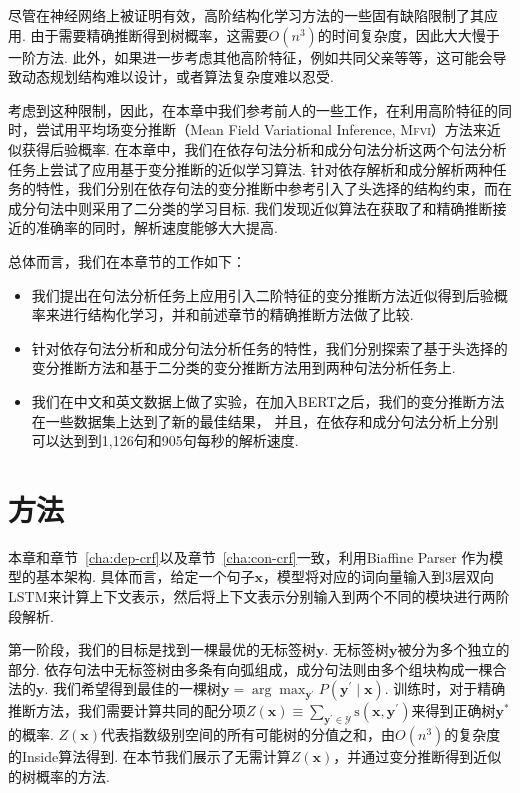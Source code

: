 尽管在神经网络上被证明有效，高阶结构化学习方法的一些固有缺陷限制了其应用.
由于需要精确推断得到树概率，这需要$O(n^3)$的时间复杂度，因此大大慢于一阶方法.
此外，如果进一步考虑其他高阶特征，例如共同父亲等等，这可能会导致动态规划结构难以设计，或者算法复杂度难以忍受.

考虑到这种限制，因此，在本章中我们参考前人的一些工作\citep{smith-eisner-2008-dependency,wang-etal-2019-second,wang-tu-2020-second}，在利用高阶特征的同时，尝试用平均场变分推断（Mean Field Variational Inference, \textsc{Mfvi}）方法来近似获得后验概率.
在本章中，我们在依存句法分析和成分句法分析这两个句法分析任务上尝试了应用基于变分推断的近似学习算法.
针对依存解析和成分解析两种任务的特性，我们分别在依存句法的变分推断中参考\cite{wang-tu-2020-second}引入了头选择的结构约束，而在成分句法中则采用了二分类的学习目标.
我们发现近似算法在获取了和精确推断接近的准确率的同时，解析速度能够大大提高.

总体而言，我们在本章节的工作如下：
\begin{itemize}
  \item 我们提出在句法分析任务上应用引入二阶特征的变分推断方法近似得到后验概率来进行结构化学习，并和前述章节的精确推断方法做了比较.
  \item 针对依存句法分析和成分句法分析任务的特性，我们分别探索了基于头选择的变分推断方法和基于二分类的变分推断方法用到两种句法分析任务上.
  \item 我们在中文和英文数据上做了实验，在加入BERT之后，我们的变分推断方法在一些数据集上达到了新的最佳结果，
        并且，在依存和成分句法分析上分别可以达到到1,126句和905句每秒的解析速度.
\end{itemize}

\section{方法}\label{sec:vi-approach}

本章和章节~\ref{cha:dep-crf}以及章节~\ref{cha:con-crf}一致，利用Biaffine Parser \citep{dozat-etal-2017-biaffine,wang-tu-2020-second}作为模型的基本架构.
具体而言，给定一个句子$\boldsymbol{x}$，模型将对应的词向量输入到3层双向LSTM来计算上下文表示，然后将上下文表示分别输入到两个不同的模块进行两阶段解析.

第一阶段，我们的目标是找到一棵最优的无标签树$\boldsymbol{y}$.
无标签树$\boldsymbol{y}$被分为多个独立的部分.
依存句法中无标签树由多条有向弧组成，成分句法则由多个组块构成一棵合法的$\boldsymbol{y}$.
我们希望得到最佳的一棵树$\boldsymbol{y}=\arg\max_{\boldsymbol{y}^{\prime}}P(\boldsymbol{y}^{\prime}\mid\boldsymbol{x})$.
训练时，对于精确推断方法，我们需要计算共同的配分项$Z(\boldsymbol{x})\equiv\sum_{\boldsymbol{y}^{\prime}\in\mathcal{Y}}\mathrm{s}(\boldsymbol{x},\boldsymbol{y}^{\prime})$来得到正确树$\boldsymbol{y}^{\ast}$的概率.
$Z(\boldsymbol{x})$代表指数级别空间的所有可能树的分值之和，由$O(n^3)$的复杂度的Inside算法得到.
在本节我们展示了无需计算$Z(\boldsymbol{x})$，并通过变分推断得到近似的树概率的方法.

